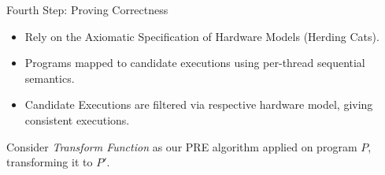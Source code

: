 \documentclass[notes, xcolor=dvipsnames]{beamer}
\begin{document}
    \begin{frame}{Fourth Step: Proving Correctness}

        \begin{itemize}
            \item Rely on the Axiomatic Specification of Hardware Models (Herding Cats).
            \item Programs mapped to candidate executions using per-thread sequential semantics.
            \item Candidate Executions are filtered via respective hardware model, giving consistent executions.
        \end{itemize}
        
    \end{frame}


    \begin{frame}
       
        Consider \emph{Transform Function} as our PRE algorithm applied on program $P$, transforming it to $P'$.
        \begin{figure}
        \end{figure}

        \begin{figure}
        \end{figure}

        \begin{figure}
        \end{figure}
        
    \end{frame}
\end{document}
